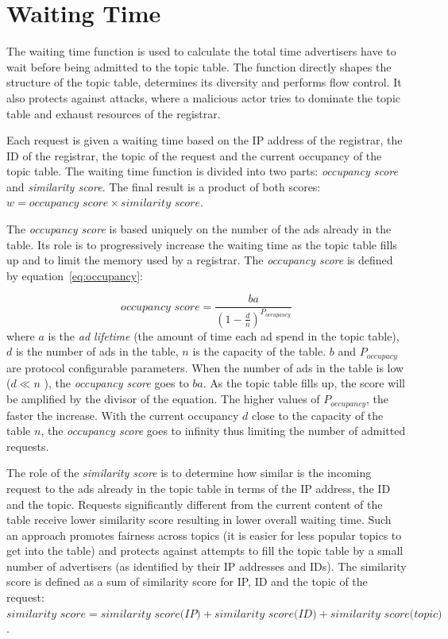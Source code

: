\section{Waiting Time}
\label{sec:waitingTime}
The waiting time function is used to calculate the total time advertisers have to wait before being admitted to the topic table. 
The function directly shapes the structure of the topic table,  determines its diversity and performs flow control. 
It also protects against attacks, where a malicious actor tries to dominate the topic table and exhaust resources of the registrar. 

Each request is given a waiting time based on the IP address of the registrar, the ID of the registrar, the topic of the request and the current occupancy of the topic table. 
The waiting time function is divided into two parts: \emph{occupancy score} and  \emph{similarity score}. The final result is a product of both scores: $w =  \textit{occupancy score} \times \textit{similarity score} $. 

The \emph{occupancy score} is based uniquely on the number of the ads already in the table.
Its role is to progressively increase the waiting time as the topic table fills up and to limit the memory used by a registrar.
The \emph{occupancy score} is defined by equation~\ref{eq:occupancy}:

\begin{equation}
\label{eq:occupancy}
    \textit{occupancy score} = \frac{ba}{(1-\frac{d}{n})^{P_{occupancy}}}
\end{equation}
where $a$ is the \emph{ad lifetime} (the amount of time each ad spend in the topic table), $d$ is the number of ads in the table, $n$ is the capacity of the table. $b$ and $P_{occupacy}$ are protocol configurable parameters. 
When the number of ads in the table is low ($d \ll n$ ), the \emph{occupancy score} goes to $ba$. 
As the topic table fills up, the score will be amplified by the divisor of the equation. 
The higher values of $P_{occupancy}$, the faster the increase. 
With the current occupancy $d$ close to the capacity of the table $n$, the \emph{occupancy score} goes to infinity thus limiting the number of admitted requests. 

The role of the \emph{similarity score} is to determine how similar is the incoming request to the ads already in the topic table in terms of the IP address, the ID and the topic. 
Requests significantly different from the current content of the table receive lower similarity score resulting in lower overall waiting time. 
Such an approach promotes fairness across topics (it is easier for less popular topics to get into the table) and protects against attempts to fill the topic table by a small number of advertisers (as identified by their IP addresses and IDs). The similarity score is defined as a sum of similarity score for IP, ID and the topic of the request: $\textit{similarity score} = \textit{similarity score(IP)} + \textit{similarity score(ID)} + \textit{similarity score(topic)}$. 

